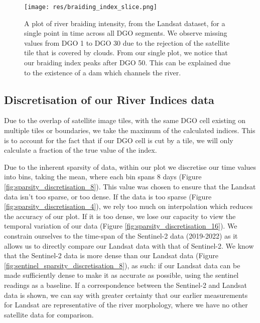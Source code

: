 \documentclass[12pt]{article}
\begin{document}
\begin{figure}[H]
    \centering
    \texttt{[image: res/braiding\_index\_slice.png]}
    \caption{A plot of river braiding intensity, from the Landsat dataset, for a single point in time across all DGO segments. We observe missing values from DGO 1 to DGO 30 due to the rejection of the satellite tile that is covered by clouds. From our single plot, we notice that our braiding index peaks after DGO 50. This can be explained due to the existence of a dam which channels the river.}
    \label{fig:braiding}
\end{figure}

\subsection{Discretisation of our River Indices data}
Due to the overlap of satellite image tiles, with the same DGO cell existing on multiple tiles or boundaries, we take the maximum of the calculated indices. This is to account for the fact that if our DGO cell is cut by a tile, we will only calculate a fraction of the true value of the index.

Due to the inherent sparsity of data, within our plot we discretise our time values into bins, taking the mean, where each bin spans 8 days (Figure \ref{fig:sparsity_discretisation_8}). This value was chosen to ensure that the Landsat data isn't too sparse, or too dense. If the data is too sparse (Figure \ref{fig:sparsity_discretisation_4}), we rely too much on interpolation which reduces the accuracy of our plot. If it is too dense, we lose our capacity to view the temporal variation of our data  (Figure \ref{fig:sparsity_discretisation_16}). We constrain ourselves to the time-span of the Sentinel-2 data (2019-2022) as it allows us to directly compare our Landsat data with that of Sentinel-2. We know that the Sentinel-2 data is more dense than our Landsat data (Figure \ref{fig:sentinel_sparsity_discretisation_8}), as such: if our Landsat data can be made sufficiently dense to make it as accurate as possible, using the sentinel readings as a baseline. If a correspondence between the Sentinel-2 and Landsat data is shown, we can say with greater certainty that our earlier measurements for Landsat are representative of the river morphology, where we have no other satellite data for comparison.
\end{document}
